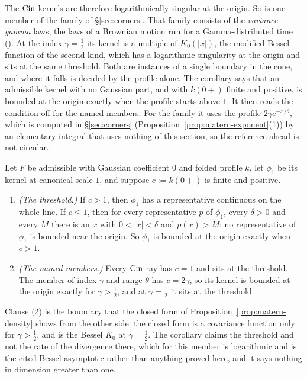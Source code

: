 The $\operatorname{Cin}$ kernels are therefore logarithmically singular at the origin. So is one member of
the \Matern{} family of \S\ref{sec:corners}. That family consists of the \emph{variance-gamma}
laws, the laws of a Brownian motion run for a Gamma-distributed time
(). At the index $\gamma = \tfrac12$ its kernel is a multiple of
$K_0(|x|)$, the modified Bessel function of the second kind, which has a logarithmic
singularity at the origin and sits at the same threshold. Both are instances of a single
boundary in the cone, and where it falls is decided by the profile alone. The corollary says
that an admissible kernel with no Gaussian part, and with $k(0{+})$ finite and positive, is
bounded at the origin exactly when the profile starts above $1$. It then reads the condition
off for the named members. For the \Matern{} family it uses the profile
$2\gamma e^{-x/\theta}$, which is computed in \S\ref{sec:corners}
(Proposition~\ref{prop:matern-exponent}(1)) by an elementary integral that uses nothing of this
section, so the reference ahead is not circular.

\begin{corollary}\label{cor:origin-boundedness}
Let $F$ be admissible with Gaussian coefficient $0$ and folded profile $k$, let $\phi_1$ be its
kernel at canonical scale $1$, and suppose $c := k(0{+})$ is finite and positive.
\begin{enumerate}
\item \emph{(The threshold.)} If $c > 1$, then $\phi_1$ has a representative continuous on the
whole line. If $c \le 1$, then for every representative $p$ of $\phi_1$, every $\delta > 0$ and
every $M$ there is an $x$ with $0 < |x| < \delta$ and $p(x) > M$; no representative of $\phi_1$
is bounded near the origin. So $\phi_1$ is bounded at the origin exactly when $c > 1$.
\item \emph{(The named members.)} Every $\operatorname{Cin}$ ray has $c = 1$ and sits at the threshold. The
\Matern{} member of index $\gamma$ and range $\theta$ has $c = 2\gamma$, so its kernel is
bounded at the origin exactly for $\gamma > \tfrac12$, and at $\gamma = \tfrac12$ it sits at the
threshold.
\end{enumerate}
\end{corollary}

Clause (2) is the boundary that the closed form of Proposition~\ref{prop:matern-density}
shows from the other side: the closed form is a \Matern{} covariance function only for
$\gamma > \tfrac12$, and is the Bessel $K_0$ at $\gamma = \tfrac12$. The corollary claims the
threshold and not the rate of the divergence there, which for this member is logarithmic and
is the cited Bessel asymptotic rather than anything proved here, and it says nothing in
dimension greater than one.

